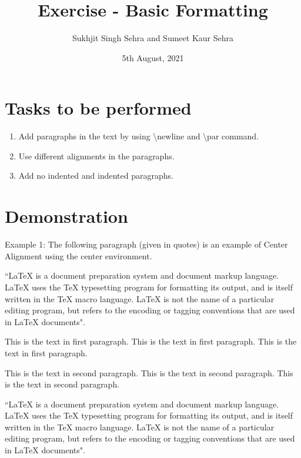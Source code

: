 \documentclass{article}
\title{Exercise - Basic Formatting}
\author{Sukhjit Singh Sehra and Sumeet Kaur Sehra}
\date{5th August, 2021}
\begin{document}
\maketitle
\section*{Tasks to be performed}

\begin{enumerate}
\item Add paragraphs in the text by using  \textbackslash newline and \textbackslash par command.

\item Use different alignments in  the paragraphs.

\item  Add no indented and indented paragraphs.
\end{enumerate}



\section*{Demonstration}
\begin{center}
Example 1: The following paragraph (given in quotes) is an example of Center Alignment using the center environment. 

``LaTeX is a document preparation system and document markup language. LaTeX uses the TeX typesetting program for formatting its output, and is itself written in the TeX macro language. LaTeX is not the name of a particular editing program, but refers to the encoding or tagging conventions that are used in LaTeX documents".
\end{center}

\setlength{\parindent}{10ex}

This is the text in first paragraph. This is the text in first 
paragraph. This is the text in first paragraph. \par
\noindent %
This is the text in second paragraph. This is the text in second 
paragraph. This is the text in second paragraph.


\begin{flushleft}
``LaTeX is a document preparation system and document markup language. LaTeX uses the TeX typesetting program for formatting its output, and is itself written in the TeX macro language. LaTeX is not the name of a particular editing program, but refers to the encoding or tagging conventions that are used in LaTeX documents".
\end{flushleft}
\end{document}
